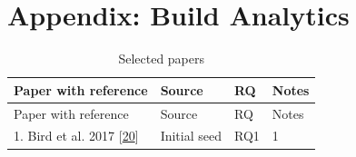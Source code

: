 \documentclass[]{book}
\begin{document}
\chapter*{Appendix: Build Analytics}\label{appendix-build-analytics}

\begin{longtable}[]{@{}llll@{}}
\caption{\label{tab:build-analytics-selected-papers} Selected
papers}\tabularnewline
\toprule
\begin{minipage}[b]{0.48\columnwidth}\raggedright\strut
Paper with reference\strut
\end{minipage} & \begin{minipage}[b]{0.20\columnwidth}\raggedright\strut
Source\strut
\end{minipage} & \begin{minipage}[b]{0.14\columnwidth}\raggedright\strut
RQ\strut
\end{minipage} & \begin{minipage}[b]{0.06\columnwidth}\raggedright\strut
Notes\strut
\end{minipage}\tabularnewline
\midrule
\endfirsthead
\toprule
\begin{minipage}[b]{0.48\columnwidth}\raggedright\strut
Paper with reference\strut
\end{minipage} & \begin{minipage}[b]{0.20\columnwidth}\raggedright\strut
Source\strut
\end{minipage} & \begin{minipage}[b]{0.14\columnwidth}\raggedright\strut
RQ\strut
\end{minipage} & \begin{minipage}[b]{0.06\columnwidth}\raggedright\strut
Notes\strut
\end{minipage}\tabularnewline
\midrule
\endhead
\begin{minipage}[t]{0.48\columnwidth}\raggedright\strut
1. Bird et al. 2017
{[}\protect\hyperlink{ref-bird2017predicting}{20}{]}\strut
\end{minipage} & \begin{minipage}[t]{0.20\columnwidth}\raggedright\strut
Initial seed\strut
\end{minipage} & \begin{minipage}[t]{0.14\columnwidth}\raggedright\strut
RQ1\strut
\end{minipage} & \begin{minipage}[t]{0.06\columnwidth}\raggedright\strut
1\strut
\end{minipage}\tabularnewline

\end{longtable}
\end{document}

